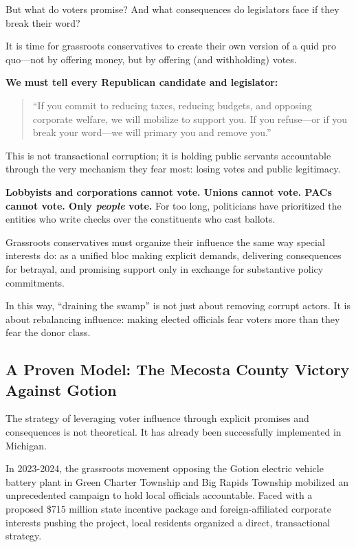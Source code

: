 But what do voters promise? And what consequences do legislators face if they break their word?

It is time for grassroots conservatives to create their own version of a quid pro quo—not by offering money, but by offering (and withholding) votes.


\textbf{We must tell every Republican candidate and legislator:}
\begin{quote}
``If you commit to reducing taxes, reducing budgets, and opposing corporate welfare, we will mobilize to support you. If you refuse—or if you break your word—we will primary you and remove you.''
\end{quote}

This is not transactional corruption; it is holding public servants accountable through the very mechanism they fear most: losing votes and public legitimacy.

\textbf{Lobbyists and corporations cannot vote. Unions cannot vote. PACs cannot vote. Only \emph{people} vote.} For too long, politicians have prioritized the entities who write checks over the constituents who cast ballots.

Grassroots conservatives must organize their influence the same way special interests do: as a unified bloc making explicit demands, delivering consequences for betrayal, and promising support only in exchange for substantive policy commitments.

In this way, ``draining the swamp'' is not just about removing corrupt actors. It is about rebalancing influence: making elected officials fear voters more than they fear the donor class.

\subsection{A Proven Model: The Mecosta County Victory Against Gotion}

The strategy of leveraging voter influence through explicit promises and consequences is not theoretical. It has already been successfully implemented in Michigan.

In 2023-2024, the grassroots movement opposing the Gotion electric vehicle battery plant in Green Charter Township and Big Rapids Township mobilized an unprecedented campaign to hold local officials accountable. Faced with a proposed \$715 million state incentive package and foreign-affiliated corporate interests pushing the project, local residents organized a direct, transactional strategy.

